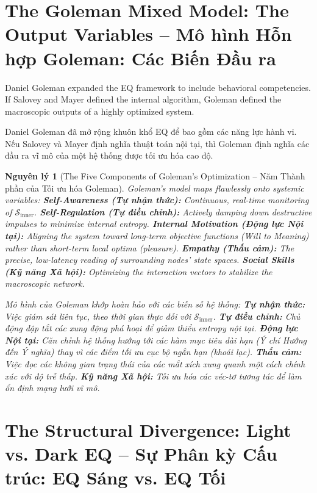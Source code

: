 \documentclass{report}
\newtheorem{nguyenly}{Nguyên lý}
\begin{document}
\section{The Goleman Mixed Model: The Output Variables -- Mô hình Hỗn hợp Goleman: Các Biến Đầu ra}

Daniel Goleman expanded the EQ framework to include behavioral competencies. If Salovey and Mayer defined the internal algorithm, Goleman defined the macroscopic outputs of a highly optimized system.

Daniel Goleman đã mở rộng khuôn khổ EQ để bao gồm các năng lực hành vi. Nếu Salovey và Mayer định nghĩa thuật toán nội tại, thì Goleman định nghĩa các đầu ra vĩ mô của một hệ thống được tối ưu hóa cao độ.

\begin{nguyenly}[The Five Components of Goleman's Optimization -- Năm Thành phần của Tối ưu hóa Goleman]
	Goleman's model maps flawlessly onto systemic variables:
	\textbf{Self-Awareness (Tự nhận thức):} Continuous, real-time monitoring of $\mathcal{S}_{\text{inner}}$.
	\textbf{Self-Regulation (Tự điều chỉnh):} Actively damping down destructive impulses to minimize internal entropy.
	\textbf{Internal Motivation (Động lực Nội tại):} Aligning the system toward long-term objective functions (Will to Meaning) rather than short-term local optima (pleasure).
	\textbf{Empathy (Thấu cảm):} The precise, low-latency reading of surrounding nodes' state spaces.
	\textbf{Social Skills (Kỹ năng Xã hội):} Optimizing the interaction vectors to stabilize the macroscopic network.
	
	Mô hình của Goleman khớp hoàn hảo với các biến số hệ thống:
	\textbf{Tự nhận thức:} Việc giám sát liên tục, theo thời gian thực đối với $\mathcal{S}_{\text{inner}}$.
	\textbf{Tự điều chỉnh:} Chủ động dập tắt các xung động phá hoại để giảm thiểu entropy nội tại.
	\textbf{Động lực Nội tại:} Căn chỉnh hệ thống hướng tới các hàm mục tiêu dài hạn (Ý chí Hướng đến Ý nghĩa) thay vì các điểm tối ưu cục bộ ngắn hạn (khoái lạc).
	\textbf{Thấu cảm:} Việc đọc các không gian trạng thái của các mắt xích xung quanh một cách chính xác với độ trễ thấp.
	\textbf{Kỹ năng Xã hội:} Tối ưu hóa các véc-tơ tương tác để làm ổn định mạng lưới vĩ mô.
\end{nguyenly}

\section{The Structural Divergence: Light vs. Dark EQ -- Sự Phân kỳ Cấu trúc: EQ Sáng vs. EQ Tối}
\end{document}
